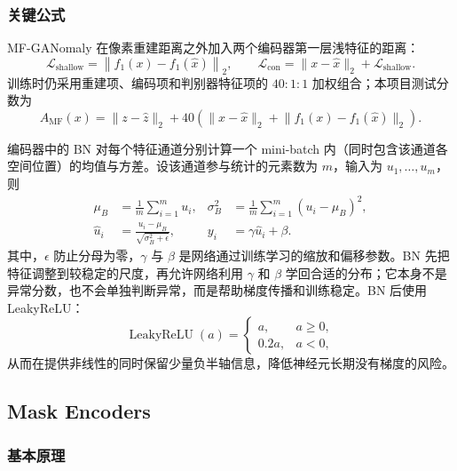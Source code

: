 \documentclass[UTF8,12pt]{ctexart}
\begin{document}
\subsubsection{关键公式}

MF-GANomaly 在像素重建距离之外加入两个编码器第一层浅特征的距离：
\begin{equation}
\mathcal{L}_{\mathrm{shallow}}
=\left\lVert f_1(x)-f_1(\hat{x})\right\rVert_2,
\qquad
\mathcal{L}_{\mathrm{con}}
=\lVert x-\hat{x}\rVert_2+\mathcal{L}_{\mathrm{shallow}}.
\end{equation}
训练时仍采用重建项、编码项和判别器特征项的 $40:1:1$ 加权组合；本项目测试分数为
\begin{equation}
A_{\mathrm{MF}}(x)=\lVert z-\hat z\rVert_2
+40\left(\lVert x-\hat x\rVert_2
+\lVert f_1(x)-f_1(\hat x)\rVert_2\right).
\end{equation}

编码器中的 BN 对每个特征通道分别计算一个 mini-batch 内（同时包含该通道各空间位置）的均值与方差。设该通道参与统计的元素数为 $m$，输入为 $u_1,\ldots,u_m$，则
\begin{align}
\mu_B&=\frac{1}{m}\sum_{i=1}^{m}u_i,
&
\sigma_B^2&=\frac{1}{m}\sum_{i=1}^{m}(u_i-\mu_B)^2,\\
\hat{u}_i&=\frac{u_i-\mu_B}{\sqrt{\sigma_B^2+\epsilon}},
&
y_i&=\gamma\hat{u}_i+\beta.
\end{align}
其中，$\epsilon$ 防止分母为零，$\gamma$ 与 $\beta$ 是网络通过训练学习的缩放和偏移参数。BN 先把特征调整到较稳定的尺度，再允许网络利用 $\gamma$ 和 $\beta$ 学回合适的分布；它本身不是异常分数，也不会单独判断异常，而是帮助梯度传播和训练稳定。BN 后使用 LeakyReLU：
\begin{equation}
\operatorname{LeakyReLU}(a)=
\begin{cases}
a, & a\ge 0,\\
0.2a, & a<0,
\end{cases}
\end{equation}
从而在提供非线性的同时保留少量负半轴信息，降低神经元长期没有梯度的风险。

\subsection{\texorpdfstring{\hspace{0.5em}}{}Mask Encoders}

\subsubsection{基本原理}
\end{document}
